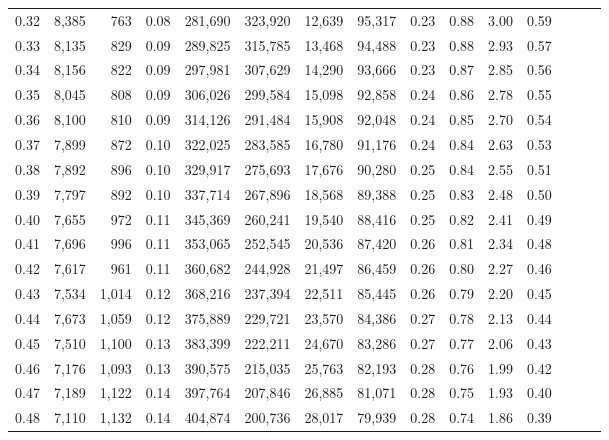 \begin{tabular}{rrrrrrrrrrrrrrr}
0.32 &   8,385 &    763 &  0.08 &  281,690 &  323,920 &   12,639 &   95,317 &  0.23 &  0.88 &  3.00 &      0.59 \\
0.33 &   8,135 &    829 &  0.09 &  289,825 &  315,785 &   13,468 &   94,488 &  0.23 &  0.88 &  2.93 &      0.57 \\
0.34 &   8,156 &    822 &  0.09 &  297,981 &  307,629 &   14,290 &   93,666 &  0.23 &  0.87 &  2.85 &      0.56 \\
0.35 &   8,045 &    808 &  0.09 &  306,026 &  299,584 &   15,098 &   92,858 &  0.24 &  0.86 &  2.78 &      0.55 \\
0.36 &   8,100 &    810 &  0.09 &  314,126 &  291,484 &   15,908 &   92,048 &  0.24 &  0.85 &  2.70 &      0.54 \\
0.37 &   7,899 &    872 &  0.10 &  322,025 &  283,585 &   16,780 &   91,176 &  0.24 &  0.84 &  2.63 &      0.53 \\
0.38 &   7,892 &    896 &  0.10 &  329,917 &  275,693 &   17,676 &   90,280 &  0.25 &  0.84 &  2.55 &      0.51 \\
0.39 &   7,797 &    892 &  0.10 &  337,714 &  267,896 &   18,568 &   89,388 &  0.25 &  0.83 &  2.48 &      0.50 \\
0.40 &   7,655 &    972 &  0.11 &  345,369 &  260,241 &   19,540 &   88,416 &  0.25 &  0.82 &  2.41 &      0.49 \\
0.41 &   7,696 &    996 &  0.11 &  353,065 &  252,545 &   20,536 &   87,420 &  0.26 &  0.81 &  2.34 &      0.48 \\
0.42 &   7,617 &    961 &  0.11 &  360,682 &  244,928 &   21,497 &   86,459 &  0.26 &  0.80 &  2.27 &      0.46 \\
0.43 &   7,534 &  1,014 &  0.12 &  368,216 &  237,394 &   22,511 &   85,445 &  0.26 &  0.79 &  2.20 &      0.45 \\
0.44 &   7,673 &  1,059 &  0.12 &  375,889 &  229,721 &   23,570 &   84,386 &  0.27 &  0.78 &  2.13 &      0.44 \\
0.45 &   7,510 &  1,100 &  0.13 &  383,399 &  222,211 &   24,670 &   83,286 &  0.27 &  0.77 &  2.06 &      0.43 \\
0.46 &   7,176 &  1,093 &  0.13 &  390,575 &  215,035 &   25,763 &   82,193 &  0.28 &  0.76 &  1.99 &      0.42 \\
0.47 &   7,189 &  1,122 &  0.14 &  397,764 &  207,846 &   26,885 &   81,071 &  0.28 &  0.75 &  1.93 &      0.40 \\
0.48 &   7,110 &  1,132 &  0.14 &  404,874 &  200,736 &   28,017 &   79,939 &  0.28 &  0.74 &  1.86 &      0.39 \\

\end{tabular}
